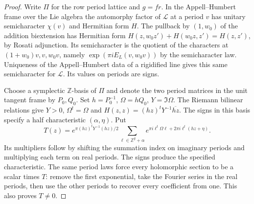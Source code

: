 \begin{proof}
Write \(\Pi\) for the row period lattice and \(g=fr\).
In the Appell--Humbert frame over the Lie algebra the automorphy
factor of \(\mathcal L\) at a period \(v\) has unitary
semicharacter \(\chi(v)\) and Hermitian form \(H\).
The pullback by \((1,w_0)\) of the addition biextension has
Hermitian form \(H(z,w_0z')+H(w_0z,z')=H(z,z')\), by Rosati
adjunction. Its semicharacter is the quotient of the characters
at \((1+w_0)v,v,w_0v\), namely
\(\exp(\pi i E_L(v,w_0v))\) by the semicharacter law. Uniqueness
of the Appell--Humbert data of a rigidified line gives this same
semicharacter for \(\mathcal L\). Its values on periods are signs.

Choose a symplectic \(\mathbb Z\)-basis of \(\Pi\) and denote the
two period matrices in the unit tangent frame by \(P_0,Q_0\).
Set \(h=P_0^{-1}\), \(\Omega=h Q_0\), \(Y=\Im\Omega\). The
Riemann bilinear relations give \(Y>0\), \(\Omega^t=\Omega\)
and \(H(z,z)=(hz)^tY^{-1}\overline{hz}\). The signs in this
basis specify a half characteristic \((\alpha,\eta)\). Put
\[
 T(z)=e^{\pi(hz)^tY^{-1}(hz)/2}
          \sum_{\ell\in\mathbb Z^g+\alpha}
           e^{\pi i\ell^t\Omega\ell+2\pi i\ell^t(hz+\eta)}.
\]
Its multipliers follow by shifting the summation index on imaginary
periods and multiplying each term on real periods. The signs
produce the specified characteristic. The same period laws
force every holomorphic section to be a scalar times \(T\):
remove the first exponential, take the Fourier series in the real
periods, then use the other periods to recover every coefficient
from one. This also proves \(T\ne0\).


\end{proof}
